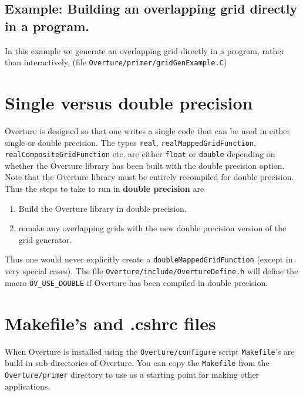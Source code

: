 \documentclass{article}
\begin{document}
\clearpage
\subsection{Example: Building an overlapping grid directly in a program.}

In this example we generate an overlapping grid directly in a program, rather than
interactively, (file {\tt Overture/primer/gridGenExample.C})
{\footnotesize
{}
}


\vfill\eject
\section{Single versus double precision}

Overture is designed so that one writes a single code that can be used in
either single or double precision. The types {\tt real}, {\tt realMappedGridFunction},
{\tt realCompositeGridFunction} etc. are either {\tt float} or {\tt double} depending on
whether the Overture library has been built with the double precision option.
 Note that the Overture
library must be entirely recompiled for double precision. Thus the steps to take to
run in {\bf double precision} are
\begin{enumerate}
  \item Build the Overture library in double precision.
  \item remake any overlapping grids with the new double precision version of the grid generator.
\end{enumerate}
Thus one would never explicitly create a {\tt doubleMappedGridFunction} (except in very special
cases).
The file {\tt Overture/include/OvertureDefine.h} will define the macro {\tt OV\_USE\_DOUBLE} if
Overture has been compiled in double precision. 

\vfill\eject
\section{Makefile's and .cshrc files}

When Overture is installed using the {\tt Overture/configure} script {\tt Makefile}'s are
build in sub-directories of Overture. You can copy the {\tt Makefile} from the 
{\tt Overture/primer} directory to use as a starting point for making other applications.
\end{document}
